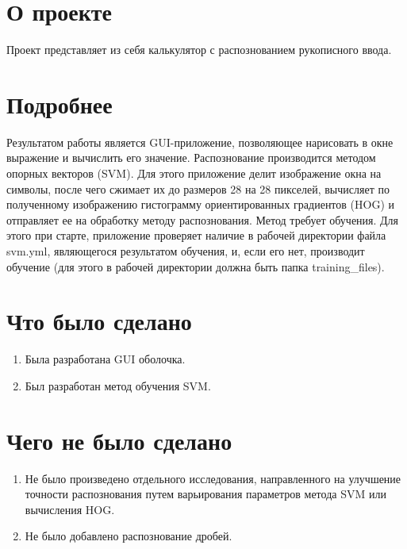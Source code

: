 \documentclass[a4paper]{article}
\begin{document}
	\section{О проекте}

	Проект представляет из себя калькулятор с распознованием рукописного ввода.
	
	\section{Подробнее}

	Результатом работы является GUI-приложение, позволяющее нарисовать в окне выражение и вычислить его значение. Распознование производится методом опорных векторов (SVM). Для этого приложение делит изображение окна на символы, после чего сжимает их до размеров 28 на 28 пикселей, вычисляет по полученному изображению гистограмму ориентированных градиентов (HOG) и отправляет ее на обработку методу распознования. Метод требует обучения. Для этого при старте, приложение проверяет наличие в рабочей директории файла svm.yml, являющегося результатом обучения, и, если его нет, производит обучение (для этого в рабочей директории должна быть папка training\_files).

	\section{Что было сделано}
	\begin{enumerate}
		\item Была разработана GUI оболочка.
		\item Был разработан метод обучения SVM.
	\end{enumerate}
	
	\section{Чего не было сделано}
	\begin{enumerate}
		\item Не было произведено отдельного исследования, направленного на улучшение точности распознования путем варьирования параметров метода SVM или вычисления HOG.
		\item Не было добавлено распознование дробей.
	\end{enumerate}

	
\end{document}
